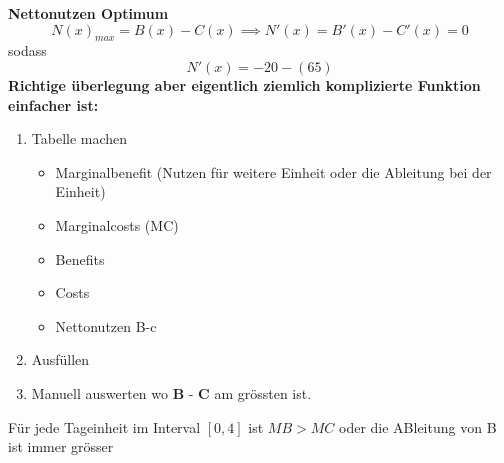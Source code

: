 \documentclass[a4paper]{article}
\begin{document}
    \textbf{Nettonutzen Optimum}
    \begin{equation}
        N(x)_{max} = B(x) - C(x) \implies N'(x) = B'(x) - C'(x)= 0
    \end{equation}
    sodass 
    \begin{equation}
        N'(x) = -20 - (65) 
    \end{equation}
    \textbf{Richtige überlegung aber eigentlich ziemlich komplizierte Funktion einfacher ist:}
    \begin{enumerate}
        \item Tabelle machen
        \begin{itemize}
            \item Marginalbenefit (Nutzen für weitere Einheit oder die Ableitung bei der Einheit)
            \item Marginalcosts (MC)
            \item Benefits
            \item Costs
            \item Nettonutzen B-c
        \end{itemize}
        \item Ausfüllen
        \item Manuell auswerten wo $\textbf{B - C}$ am grössten ist.
    \end{enumerate}
     Für jede Tageinheit im Interval $[0,4]$ ist $MB > MC$ oder die ABleitung von B ist immer grösser 
    
\end{document}
